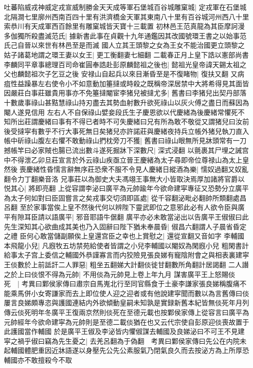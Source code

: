 吐蕃陷威戎神威定戎宣威制勝金天天成等軍石堡城百谷城雕窠城|{
	定戎軍在石堡城北隔澗七里廓州西南百四十里有洪濟橋金天軍其東南八十里有百谷城河州西八十里索恭川有天成軍西百餘里有雕窠城皆天寶十三載置}
初林邑王范真龍為其臣摩訶漫多伽獨所殺盡滅范氏|{
	據新書此事在貞觀十九年通鑑因其改國號環王書之以始事范氏己自晉以來世有林邑至是而滅}
國人立其王頭黎之女為王女不能治國更立頭黎之姑子諸葛地謂之環王妻以女王|{
	更工衡翻妻七細翻}
二載春正月上皇下誥以憲部尚書李麟同平章事總理百司命崔圓奉誥赴彭原麟懿祖之後也|{
	懿祖光皇帝諱天錫太祖之父也麟懿祖次子乞豆之後}
安禄山自起兵以來目漸昏至是不復睹物|{
	復扶又翻}
又病疽性益躁暴左右使令小不如意動加箠撻或時殺之既稱帝深居禁中大將希得見其面皆因嚴莊白事莊雖貴用事亦不免箠撻閹宦李猪兒被撻尤多|{
	舊書曰李猪兒出契丹部落十數歲事祿山甚黠慧祿山持刃盡去其勢血射數升欲死祿山以灰火傅之盡日而蘇因為閹人遂見信用}
左右人不自保祿山嬖妾段氏生子慶恩欲以代慶緒為後慶緒常懼死不知所出莊謂慶緒曰事有不得已者時不可失慶緒曰兄有所為敢不敬從又謂猪兒曰汝前後受撻寜有數乎不行大事死無日矣猪兒亦許諾莊與慶緒夜持兵立帳外猪兒執刀直入帳中斫祿山腹左右懼不敢動祿山捫枕旁刀不獲|{
	舊書曰祿山眼無所見牀頭常有一刀}
撼帳竿曰必家賊也腸已流出數斗遂死掘牀下深數尺|{
	深式浸翻}
以氈裹其尸埋之誡宫中不得泄乙卯旦莊宣言於外云祿山疾亟立晉王慶緒為太子尋即帝位尊禄山為太上皇然後喪慶緒性昏懦言辭無序莊恐衆不服不令見人慶緒日縱酒為樂|{
	懦奴過翻又奴亂翻令力丁翻樂音洛}
兄事莊以為御史大夫馮翊王事無大小皆取決焉厚加諸將官爵以悦其心|{
	將即亮翻}
上從容謂李泌曰廣平為元帥踰年今欲命建寜專征又恐勢分立廣平為太子何如對曰臣固嘗言之矣戎事交切須即區處|{
	從千容翻泌毗必翻帥所類翻處昌呂翻}
至於家事當俟上皇不然後代何以辨陛下靈武即位之意邪此必有人欲令臣與廣平有隙耳臣請以語廣平|{
	邪音耶語牛倨翻}
廣平亦必未敢當泌出以告廣平王俶俶曰此先生深知其心欲曲成其美也乃入固辭曰陛下猶未奉晨昏|{
	俶昌六翻謂人子晨省昏定之禮}
臣何心敢當儲副願俟上皇還宫臣之幸也上賞慰之|{
	還從宣翻又音如字}
李輔國本飛龍小兒|{
	凡廐牧五坊禁苑給使者皆謂之小兒李輔國以閹奴為閑廐小兒}
粗閑書計給事太子宫上委信之輔國外恭謹寡言而内狡險見張良娣有寵陰附會之與相表裏建寜王倓數於上前詆訐二人罪惡|{
	粗坐五翻娣大計翻倓徙甘翻數所角翻計居謁翻}
二人譖之於上曰倓恨不得為元帥|{
	不用倓為元帥見上卷上年九月}
謀害廣平王上怒賜倓死　|{
	考異曰鄴侯家傳曰肅宗自馬嵬北行至同官縣食于土豪李謙家張良娣稱腹痛不能乘馬併小女寄謙家而去上即位使人迎之迎者或有他說建寜聞而數以為言舊傳曰倓屢言良娣頗專恣與護國連結内外欲傾動皇嗣未知孰是實録新舊本紀皆無倓死年月列傳云倓死明年冬廣平王復兩京然則倓死在至德元載也按鄴侯家傳上從容言曰廣平為元帥經年今欲命建寜為元帥則是至德二載倓猶在也又云代宗使自彭原迎倓喪故置于此護國當作輔國}
於是廣平王俶及李泌皆内懼俶謀去輔國及良娣泌曰不可王不見建寜之禍乎俶曰竊為先生憂之|{
	去羌呂翻為于偽翻　考異曰鄴侯家傳曰先公在内院未起輔國體肥重因近牀語遂以身壓先公先公素服氣乃閉氣良久而去按泌方為上所厚恐輔國亦不敢擅殺今不取}
